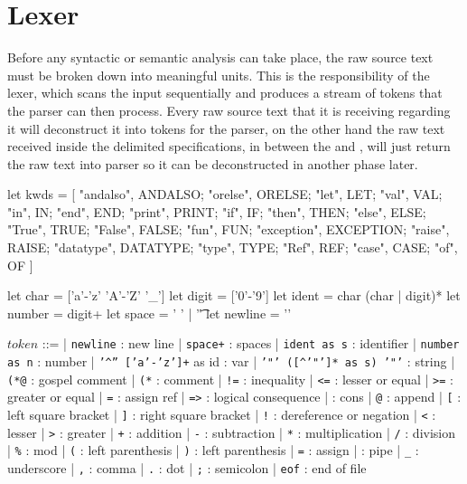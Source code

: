\section{Lexer}
\label{sec:Lexer}

Before any syntactic or semantic analysis can take place, the raw source text must be broken down into meaningful units. This is the responsibility 
of the lexer, which scans the input sequentially and produces a stream of tokens that the parser can then process. Every raw source text that it is
receiving regarding \cml it will deconstruct it into tokens for the parser, on the other hand the raw text received inside the delimited \gospel
specifications, in between the  and \inlinecode{*)}, will just return the raw text into parser so it can be deconstructed in another
phase later.

\begin{ocamlenv}
    let kwds = [
        "andalso", ANDALSO;
        "orelse", ORELSE;
        "let", LET;
        "val", VAL;
        "in", IN;
        "end", END;
        "print", PRINT;
        "if", IF;
        "then", THEN;
        "else", ELSE;
        "True", TRUE;
        "False", FALSE;
        "fun", FUN;
        "exception", EXCEPTION;
        "raise", RAISE;
        "datatype", DATATYPE;
        "type", TYPE;
        "Ref", REF;
        "case", CASE;
        "of", OF
    ]

    let char = ['a'-'z' 'A'-'Z' '_']
    let digit = ['0'-'9']
    let ident = char (char | digit)*
    let number = digit+
    let space = ' ' | '\t'
    let newline = '\n'
\end{ocamlenv}

\begin{center}
\begin{bnf}
$token$ ::=
| \texttt{newline} : new line
| \texttt{space+} : spaces
| \texttt{ident as s} : identifier
| \texttt{number as n} : number
| \texttt{'\textasciicircum'' ['a'-'z']+} as id : var
| \texttt{'"' ([\textasciicircum'"']* as s) '"'} : string
| \texttt{(*@} : gospel comment
| \texttt{(*} : comment
| \texttt{!=} : inequality
| \texttt{<=} : lesser or equal
| \texttt{>=} : greater or equal
| \texttt{=} : assign ref
| \texttt{=>} : logical consequence
|  : cons
| \texttt{@} : append
| \texttt{[} : left square bracket
| \texttt{]} : right square bracket
| \texttt{!} : dereference or negation
| \texttt{<} : lesser
| \texttt{>} : greater
| \texttt{+} : addition
| \texttt{-} : subtraction
| \texttt{*} : multiplication
| \texttt{/} : division
| \texttt{\%} : mod
| \texttt{(} : left parenthesis
| \texttt{)} : left parenthesis
| \texttt{=} : assign
|  : pipe
| \texttt{\_} : underscore
| \texttt{,} : comma
| \texttt{.} : dot
| \texttt{;} : semicolon
| \texttt{eof} : end of file
\end{bnf}
\end{center}

